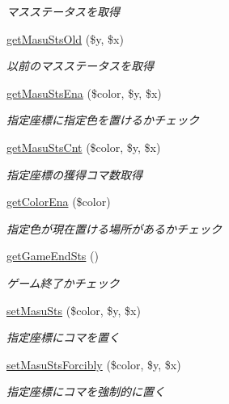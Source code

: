 \begin{DoxyCompactItemize}
\begin{DoxyCompactList}\small\item\em マスステータスを取得 \end{DoxyCompactList}\item 
\hyperlink{class_reversi_a1688a929d3917e19510f6501c42d6a2b}{get\+Masu\+Sts\+Old} (\$y, \$x)
\begin{DoxyCompactList}\small\item\em 以前のマスステータスを取得 \end{DoxyCompactList}\item 
\hyperlink{class_reversi_a22088e18c7f837f49093595261c30e4e}{get\+Masu\+Sts\+Ena} (\$color, \$y, \$x)
\begin{DoxyCompactList}\small\item\em 指定座標に指定色を置けるかチェック \end{DoxyCompactList}\item 
\hyperlink{class_reversi_a10bfc13effc2db9a681a2906792be453}{get\+Masu\+Sts\+Cnt} (\$color, \$y, \$x)
\begin{DoxyCompactList}\small\item\em 指定座標の獲得コマ数取得 \end{DoxyCompactList}\item 
\hyperlink{class_reversi_aead5ee041feb6ac2609266614ea06f78}{get\+Color\+Ena} (\$color)
\begin{DoxyCompactList}\small\item\em 指定色が現在置ける場所があるかチェック \end{DoxyCompactList}\item 
\hyperlink{class_reversi_aab9985c789e464de6cf99d7d725cb5a3}{get\+Game\+End\+Sts} ()
\begin{DoxyCompactList}\small\item\em ゲーム終了かチェック \end{DoxyCompactList}\item 
\hyperlink{class_reversi_a26f3168c7d94e70d344841d65885a4ac}{set\+Masu\+Sts} (\$color, \$y, \$x)
\begin{DoxyCompactList}\small\item\em 指定座標にコマを置く \end{DoxyCompactList}\item 
\hyperlink{class_reversi_ae659a2ce33e395f8d5cda5e62d03fe7e}{set\+Masu\+Sts\+Forcibly} (\$color, \$y, \$x)
\begin{DoxyCompactList}\small\item\em 指定座標にコマを強制的に置く \end{DoxyCompactList}\item 

\end{DoxyCompactItemize}
